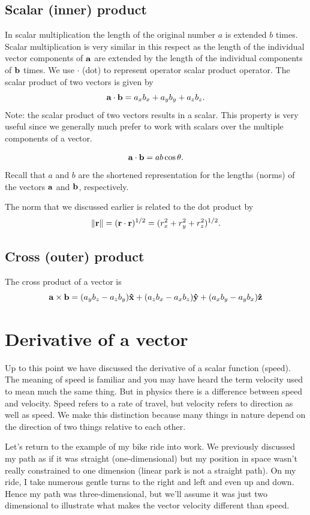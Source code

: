 \subsection{Scalar (inner) product}

In scalar multiplication the length of the original number $a$ is extended $b$
times.  Scalar multiplication is very similar in this respect as the length of
the individual vector components of $\vb{a}$ are extended by the length of the
individual components of $\vb{b}$ times.  We use $\cdot$ (dot) to represent
operator scalar product operator.  The scalar product of two vectors is given by
\begin{equation}
    \vb{a}\cdot\vb{b} = a_x b_x + a_y b_y + a_z b_z .
\end{equation}
Note: the scalar product of two vectors results in a scalar.  This property is
very useful since we generally much prefer to work with scalars over the
multiple components of a vector.

\begin{equation}
    \vb{a} \cdot \vb{b} = ab \cos \theta .
\end{equation}
Recall that $a$ and $b$ are the shortened representation for the lengths (norms)
of the vectors $\vb{a}$ and $\vb{b}$, respectively.


The norm that we discussed earlier is related to the dot product by
\begin{equation}
    \norm{\vb{r}} = (\vb{r}\cdot\vb{r})^{1/2} = (r_x^2 + r_y^2 + r_z^2)^{1/2} .
\end{equation}

\subsection{Cross (outer) product}
The cross product of a vector is
\begin{equation}
    \vb{a} \times \vb{b} = (a_y b_z - a_z b_y) \vu{x} 
    + (a_z b_x - a_x b_z) \vu{y} + (a_x b_y - a_y b_x) \vu{z}
\end{equation}


\section{Derivative of a vector}
Up to this point we have discussed the derivative of a scalar function
(speed).  The meaning of speed is familiar and you may have heard the term
velocity used to mean much the same thing.  But in physics there is a 
difference between speed and velocity.  Speed refers to a rate of travel, but
velocity refers to direction as well as speed.  We make this distinction because
many things in nature depend on the direction of two things relative to each
other.

Let's return to the example of my bike ride into work.  We previously discussed
my path as if it was straight (one-dimensional) but my position in space wasn't
really constrained to one dimension (linear park is not a straight path).  On my
ride, I take numerous gentle turns to the right and left and even up and down.
Hence my path was three-dimensional, but we'll assume it was just two
dimensional to illustrate what makes the vector velocity different than speed.
